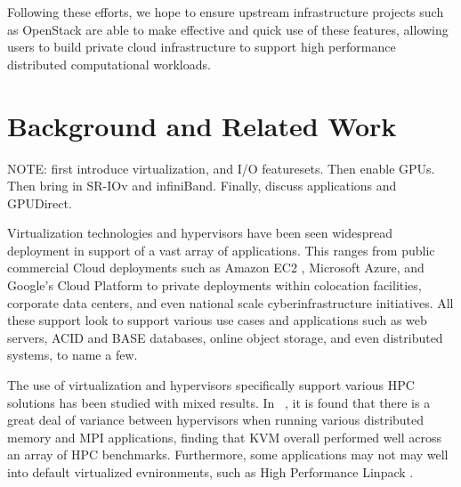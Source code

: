 \documentclass[times,10pt,twocolumn,conference]{IEEEtran}
\begin{document}
Following these efforts, we hope to ensure upstream infrastructure projects such as OpenStack \cite{www-openstack} are able to make effective and quick use of these features, allowing users to build private cloud infrastructure to support high performance distributed computational workloads. 





 


\section{Background and Related Work}

NOTE: first introduce virtualization, and I/O featuresets. Then enable GPUs. Then bring in SR-IOv and infiniBand. Finally, discuss applications and GPUDirect.

Virtualization technologies and hypervisors have been seen widespread deployment in support of a vast array of applications.  This ranges from public commercial Cloud deployments such as Amazon EC2 \cite{www-ec2}, Microsoft Azure, and Google's Cloud Platform \cite{www-google-cloud} to private deployments within colocation facilities, corporate data centers, and even national scale cyberinfrastructure initiatives.  All these support look to support various use cases and applications such as web servers, ACID and BASE databases, online object storage, and even distributed systems, to name a few.  

The use of virtualization and hypervisors specifically support various HPC solutions has been studied with mixed results.  In ~\cite{Younge2011cloud}, it is found that there is a great deal of variance between hypervisors when running various distributed memory and MPI applications, finding that KVM overall performed well across an array of HPC benchmarks.  Furthermore, some applications may not may well into default virtualized evnironments, such as High Performance Linpack \cite{piotr-2011-utk}.  
\end{document}
